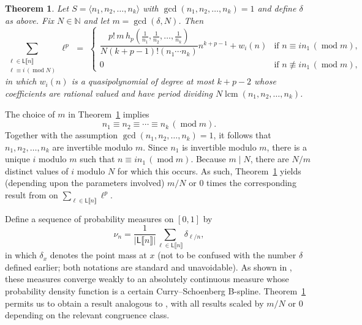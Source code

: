 \documentclass[10pt,reqno]{amsart}
\newcommand{\NN}{\mathbb{N}}
\newcommand{\Le}{\mathsf{L}}
\newcommand{\lcm}{\operatorname{lcm}}
\providecommand{\multi}[1]{\llbracket #1 \rrbracket}
\newcommand{\0}{\color{lightgray}0}
\renewcommand{\pmod}[1]{\,(\operatorname{mod} #1)}
\renewcommand\>{\rangle}
\newcommand\<{\langle}
\theoremstyle{plain}
\newtheorem{Theorem}[equation]{Theorem}
\theoremstyle{definition}
\begin{document}
\begin{Theorem}\label{Theorem:Moments}
Let $S = \<n_1,n_2,\ldots,n_k\>$ with $\gcd(n_1,n_2,\ldots,n_k)=1$ and define $\delta$ as above.  Fix $N \in \NN$ and let $m = \gcd(\delta, N)$.  
Then 
\begin{equation*}
\sum_{\substack{\ell \in \Le\multi{n} \\ \ell \equiv i \pmod{N}}} \!\!\!\!\!\!\!\! \ell^p \,\, =\,\,
\begin{cases}
\dfrac{p! \,m\, h_p ( \frac{1}{n_1}, \frac{1}{n_2}, \ldots, \frac{1}{n_k} )}{N(k + p - 1)! (n_1 \cdots n_k)}  n^{k+p-1} + w_i(n)
  & \text{if $n \equiv i n_1 \pmod{ m }$}, \\[10pt]
0 &\text{if $n \not \equiv i n_1 \pmod{ m}$},
\end{cases}
\end{equation*}
in which $w_i(n)$ is a quasipolynomial of degree at most $k+p-2$ whose coefficients are rational valued and have period dividing 
$N\lcm(n_1,n_2,\ldots,n_k)$.
\end{Theorem}

The choice of $m$ in Theorem~\ref{Theorem:Moments} implies
\begin{equation}\label{eq:AllSameMod}
n_1 \equiv n_2 \equiv \cdots \equiv n_k \pmod{m}.
\end{equation}
Together with the assumption $\gcd(n_1,n_2,\ldots,n_k)=1$, it follows that $n_1,n_2,\ldots,n_k$ are invertible modulo $m$.
Since $n_1$ is invertible modulo $m$,
there is a unique $i$ modulo $m$ such that $n \equiv i n_1 \pmod{ m}$.  Because $m \mid N$,
there are $N/m$ distinct values of $i$ modulo $N$ for which this occurs.
As such, Theorem~\ref{Theorem:Moments} yields (depending upon the parameters involved) $m/N$ or $0$ times the corresponding result from \cite[Thm.~2]{GOOY} on $\sum_{\ell \in \Le\multi{n}} \ell^p$.

Define a sequence of probability measures on $[0,1]$ by
\begin{equation*}
\nu_n = \frac{1}{| \Le \multi{n}|}\sum_{\ell \in \Le\multi{n}} \delta_{\ell/n},
\end{equation*}
in which $\delta_x$ denotes the point mass at $x$ (not to be confused with the number $\delta$ defined
earlier; both notations are standard and unavoidable).  As shown in \cite[Thm.~1]{GOOY},
these measures converge weakly to an absolutely continuous measure whose probability density
function is a certain Curry--Schoenberg B-spline.  Theorem~\ref{Theorem:Moments}
permits us to obtain a result analogous to \cite[Thm.~1]{GOOY}, with all results scaled by $m/N$ or $0$ depending on the relevant congruence class.
\end{document}
